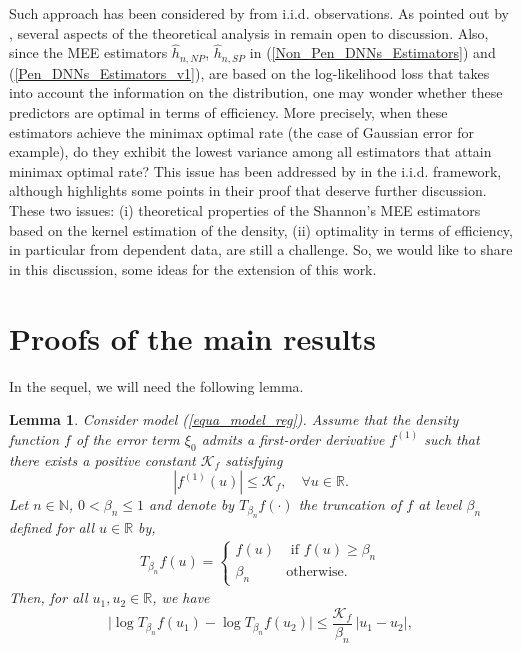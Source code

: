 \documentclass[10pt,twoside]{article}
\numberwithin{equation}{section}
\newtheorem{lem}[thm]{Lemma}
\newcommand{\R}{\ensuremath{\mathbb{R}}}
\newcommand{\N}{\ensuremath{\mathbb{N}}}
\begin{document}
 \medskip
 \noindent
Such approach has been considered by \cite{wang2025deep} from i.i.d. observations. 
As pointed out by \cite{li2025comment}, several aspects of the theoretical analysis in \cite{wang2025deep} remain open to discussion. 
%
Also, since the MEE estimators $\widehat{h}_{n, NP}$, $\widehat{h}_{n,SP}$ in (\ref{Non_Pen_DNNs_Estimators}) and (\ref{Pen_DNNs_Estimators_v1}), are based on the log-likelihood loss that takes into account the information on the distribution, one may wonder whether these predictors are optimal in terms of efficiency.
%
More precisely, when these estimators achieve the
minimax optimal rate (the case of Gaussian error for example), do they exhibit the lowest variance among 
all estimators that attain minimax optimal rate?
%
This issue has been addressed by \cite{wang2025deep} in the i.i.d. framework, although \cite{li2025comment} highlights some points in their proof that deserve further discussion. 
%
%
These two issues: (i) theoretical properties of the Shannon's MEE estimators based on the kernel estimation of the density, (ii) optimality in terms of efficiency, in particular from dependent data, are still a challenge.
So, we would like to share in this discussion, some ideas for the extension of this work.
 
%


\section{Proofs of the main results}\label{prove}
%
%
In the sequel, we will need the following lemma.
% 

\begin{lem}\label{Lemma1}
  Consider model (\ref{equa_model_reg}). Assume that the density function $f$ of the error term $\xi_0$ admits a first-order derivative $f^{(1)}$ such that there exists a positive constant $\mathcal{K}_f$ satisfying 
  \[
    |f^{(1)}(u)| \leq \mathcal{K}_f, \quad \forall u \in \R.
  \]
 Let $n \in \N$, $0 < \beta_n \leq 1$ and denote by $T_{\beta_n} f(\cdot)$ the truncation of $f$ at level $\beta_n$ defined for all $u \in \R$ by,
 \begin{align}\label{equa_truncation_func_f}
T_{\beta_n}f(u) = \left\{
\begin{array}{ll}
  f(u)   & \text{ if } f(u) \ge \beta_n  \\
  \beta_n   &  \text{otherwise}.
\end{array}
\right.
\end{align}
  Then, for all $u_1, u_2 \in \R$, we have
  \begin{equation}\label{Proof_log_Tbeta_Lipschitz}
    \big|\log T_{\beta_n} f(u_1) - \log T_{\beta_n} f(u_2)\big|
    \leq \frac{\mathcal{K}_f}{\beta_n}\, |u_1 - u_2|,
  \end{equation}
\end{lem}
\end{document}
